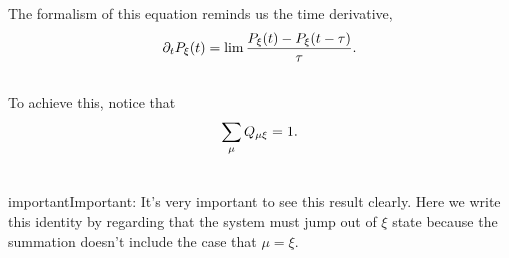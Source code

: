 \documentclass[letterpaper,10pt,english]{sphinxmanual}
\begin{document}
The formalism of this equation reminds us the time derivative,
\begin{gather}
\begin{split}\partial_t P_\xi(t) = \lim \frac{P_\xi(t) - P_\xi(t-\tau)}{\tau} .\end{split}\notag\\\begin{split}\end{split}\notag
\end{gather}
To achieve this, notice that
\begin{gather}
\begin{split}\sum_\mu Q_{\mu\xi} = 1.\end{split}\notag\\\begin{split}\end{split}\notag
\end{gather}
\begin{notice}{important}{Important:}
It's very important to see this result clearly. Here we write this identity by regarding that the system must jump out of $\xi$ state because the summation doesn't include the case that $\mu=\xi$.
\end{notice}
\end{document}
